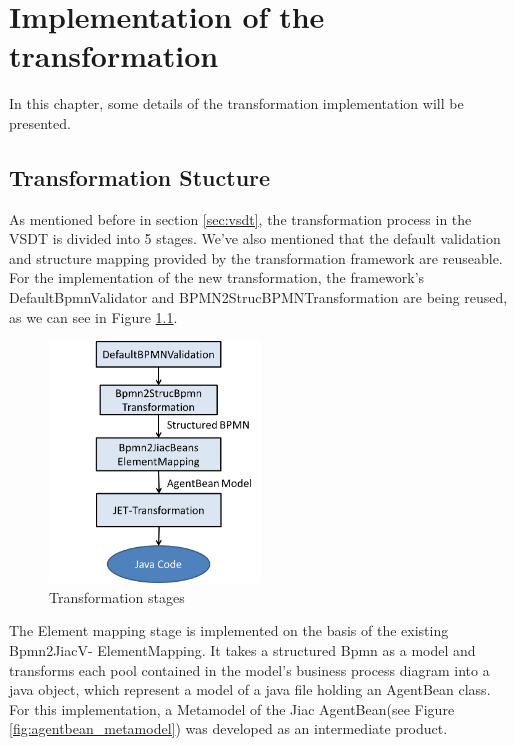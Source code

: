 \chapter{Implementation of the transformation}
\label{chap:implementation}
In this chapter, some details of the transformation implementation will be presented. 

\section{Transformation Stucture}
As mentioned before in section \ref{sec:vsdt}, the transformation process in the VSDT is divided into 5 stages. We've also mentioned that the default validation and structure mapping provided by the transformation framework are reuseable. For the implementation of the new transformation, the framework's DefaultBpmnValidator and BPMN2StrucBPMNTransformation are being reused, as we can see in Figure \ref{fig:implementation_stages}.

\begin{figure}[h]
	\centering		\includegraphics[width=0.5\textwidth]{images/implementation_stages.png}
	\caption{Transformation stages}
	\label{fig:implementation_stages}
\end{figure}

The Element mapping stage is implemented on the basis of the existing Bpmn2JiacV- ElementMapping. It takes a structured Bpmn as a model and transforms each pool contained in the model's business process diagram into a java object, which represent a model of a java file holding an AgentBean class. For this implementation, a Metamodel of the Jiac AgentBean(see Figure \ref{fig:agentbean_metamodel}) was developed as an intermediate product. 

